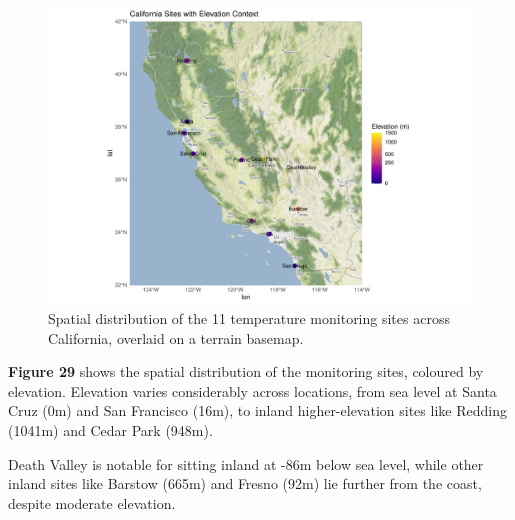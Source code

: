 \documentclass[
  11pt,
]{article}
\begin{document}
\begin{figure}[H]

{\centering \includegraphics{project_files/figure-pdf/ca_map_elevation-1.pdf}

}

\caption{Spatial distribution of the 11 temperature monitoring sites
across California, overlaid on a terrain basemap.}

\end{figure}%

\textbf{Figure 29} shows the spatial distribution of the monitoring
sites, coloured by elevation. Elevation varies considerably across
locations, from sea level at Santa Cruz (0m) and San Francisco (16m), to
inland higher-elevation sites like Redding (1041m) and Cedar Park
(948m).

Death Valley is notable for sitting inland at -86m below sea level,
while other inland sites like Barstow (665m) and Fresno (92m) lie
further from the coast, despite moderate elevation.
\end{document}
